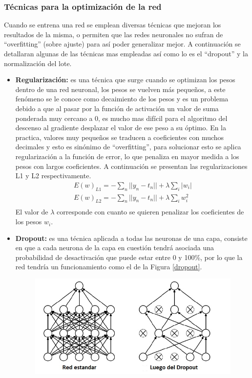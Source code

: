 \subsubsection{Técnicas para la optimización de la red}
Cuando se entrena una red se emplean diversas técnicas que mejoran los resultados de la misma, o permiten que las redes neuronales no sufran de ``overfitting'' (sobre ajuste) para así poder generalizar mejor. A continuación se detallaran algunas de las técnicas mas empleadas así como lo es el ``dropout'' y la normalización del lote.
\begin{itemize}
    \item \textbf{Regularización:} es una técnica que surge cuando se optimizan los pesos dentro de una red neuronal, los pesos se vuelven más pequeños, a este fenómeno se le conoce como decaimiento de los pesos y es un problema debido a que al pasar por la función de activación un valor de suma ponderada muy cercano a 0, es mucho mas difícil para el algoritmo del descenso al gradiente desplazar el valor de ese peso a su óptimo. En la practica, valores muy pequeños se traducen a coeficientes con muchos decimales y esto es sinónimo de ``overfitting'', para solucionar esto se aplica regularización a la función de error, lo que penaliza en mayor medida a los pesos con largos coeficientes. A continuación se presentan las regularizaciones L1 y L2 respectivamente.
    \begin{align}
          E(w)_{L1} = - \sum_{n} ||y_{n} - t_{n}|| + \lambda \sum_{i} |w_{i}|\\
          E(w)_{L2} = - \sum_{n} ||y_{n} - t_{n}|| + \lambda \sum_{i} w_{i}^{2}\\
    \end{align}
    El valor de $\lambda$ corresponde con cuanto se quieren penalizar los coeficientes de los pesos $w_{i}$.
    \item \textbf{Dropout:} es una técnica aplicada a todas las neuronas de una capa, consiste en que a cada neurona de la capa en cuestión tendrá asociada una probabilidad de desactivación que puede estar entre 0 y 100\%, por lo que la red tendría un funcionamiento como el de la Figura \ref{dropout}.
    \begin{figure}[H]
        \centering
        \includegraphics[scale=0.7]{Recursos/Dropout.jpg}

\end{figure}
\end{itemize}
